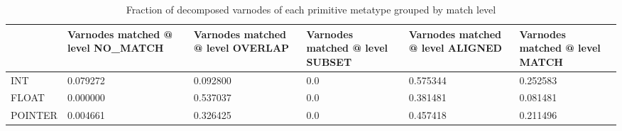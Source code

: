\begin{table}[t]
\centering
\caption{Fraction of decomposed varnodes of each primitive metatype grouped by match level}
\label{table:metatype-match-levels-ratios-decomposed}
\begin{tabular}{lp{3.6cm}p{3.6cm}p{3.6cm}p{3.6cm}p{3.6cm}}
\toprule
{} &  Varnodes matched @ level NO\_MATCH &  Varnodes matched @ level OVERLAP &  Varnodes matched @ level SUBSET &  Varnodes matched @ level ALIGNED &  Varnodes matched @ level MATCH \\
\midrule
INT     &                           0.079272 &                          0.092800 &                              0.0 &                          0.575344 &                        0.252583 \\
FLOAT   &                           0.000000 &                          0.537037 &                              0.0 &                          0.381481 &                        0.081481 \\
POINTER &                           0.004661 &                          0.326425 &                              0.0 &                          0.457418 &                        0.211496 \\
\bottomrule
\end{tabular}
\end{table}
